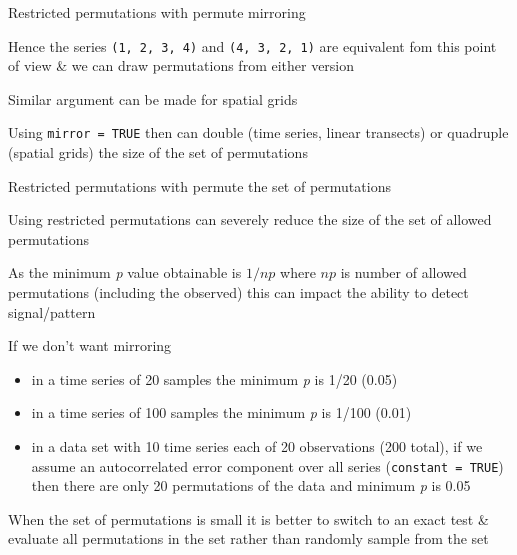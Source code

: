 \documentclass[10pt,ignorenonframetext,compress, aspectratio=169]{beamer}
\begin{document}
\begin{frame}{Restricted permutations with permute \textbar{} mirroring}

Hence the series \texttt{(1,\ 2,\ 3,\ 4)} and \texttt{(4,\ 3,\ 2,\ 1)}
are equivalent fom this point of view \& we can draw permutations from
either version

Similar argument can be made for spatial grids

Using \texttt{mirror\ =\ TRUE} then can double (time series, linear
transects) or quadruple (spatial grids) the size of the set of
permutations

\end{frame}

\begin{frame}{Restricted permutations with permute \textbar{} the set of
permutations}

Using restricted permutations can severely reduce the size of the set of
allowed permutations

As the minimum \emph{p} value obtainable is \(1 / np\) where \(np\) is
number of allowed permutations (including the observed) this can impact
the ability to detect signal/pattern

If we don't want mirroring

\begin{itemize}
\itemsep1pt\parskip0pt
\item
  in a time series of 20 samples the minimum \emph{p} is 1/20 (0.05)
\item
  in a time series of 100 samples the minimum \emph{p} is 1/100 (0.01)
\item
  in a data set with 10 time series each of 20 observations (200 total),
  if we assume an autocorrelated error component over all series
  (\texttt{constant\ =\ TRUE}) then there are only 20 permutations of
  the data and minimum \emph{p} is 0.05
\end{itemize}

When the set of permutations is small it is better to switch to an exact
test \& evaluate all permutations in the set rather than randomly sample
from the set

\end{frame}
\end{document}
